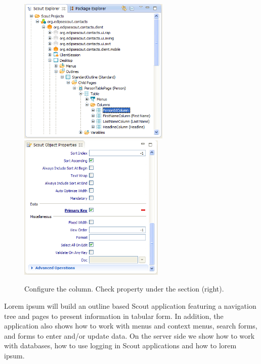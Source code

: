\documentclass[a4paper,10pt,twoside]{book}
\begin{document}
\begin{figure}
\includegraphics[height=7cm]{person_id_column.png} \hspace{5mm}
\includegraphics[height=7cm]{person_id_property.png}
\caption{Configure the  column. Check property  under the section  (right).}
\end{figure}

Lorem ipsum will build an outline based Scout application featuring a navigation tree and pages to present information in tabular form. 
In addition, the application also shows how to work with menus and context menus, search forms, and forms to enter and/or update data. 
On the server side we show how to work with databases, how to use logging in Scout applications and how to lorem ipsum. 
\end{document}

